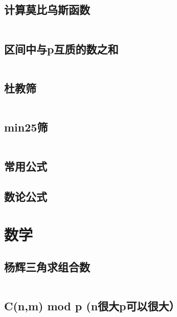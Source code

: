 \inputminted{cpp}{code/超级乘方.cc}

\subsection{计算莫比乌斯函数} 

\inputminted{cpp}{code/mobius.cc}

\subsection{区间中与p互质的数之和} 

\inputminted{cpp}{code/区间中与p互质的数之和.cc}

\subsection{杜教筛} 

\inputminted{cpp}{code/Dujiao.cc}

\subsection{min25筛} 

\inputminted{cpp}{code/min25筛.cc}

\subsection{常用公式} 



\subsection{数论公式} 



\newpage\section{数学} 
\subsection{杨辉三角求组合数} 

\inputminted{cpp}{code/杨辉三角求组合数.cc}

\subsection{C(n,m) mod p (n很大p可以很大）} 

